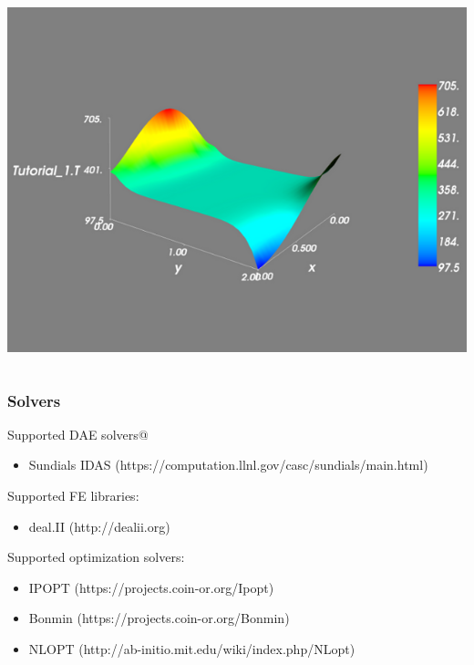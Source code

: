 \documentclass{beamer}
\begin{document}
\begin{frame}
\begin{columns}
\begin{column}{0.5\paperwidth}
    \begin{center}
      \includegraphics[width=0.3\paperwidth]{../_static/sample_3d_plot.png}
    \end{center}
  \end{column}
\end{columns}
\end{frame}

\begin{frame}
\frametitle{Solvers}
\begin{block}{}
Supported DAE solvers@
\begin{itemize}
  \item Sundials IDAS ({\small https://computation.llnl.gov/casc/sundials/main.html})
\end{itemize}
\end{block}

\begin{block}{}
Supported FE libraries:
\begin{itemize}
  \item deal.II ({\small http://dealii.org})
\end{itemize}
\end{block}

\begin{block}{}
Supported optimization solvers:
\begin{itemize}
  \item IPOPT ({\small https://projects.coin-or.org/Ipopt}) 
  \item Bonmin ({\small https://projects.coin-or.org/Bonmin}) 
  \item NLOPT ({\small http://ab-initio.mit.edu/wiki/index.php/NLopt}) 
\end{itemize}
\end{block}
\end{frame}
\end{document}
